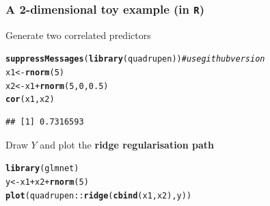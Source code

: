 \documentclass[10pt, c, xcolor=x11names]{beamer}\usepackage[]{graphicx}\usepackage[]{color}
\makeatletter
\newcommand{\hlnum}[1]{\textcolor[rgb]{0.686,0.059,0.569}{#1}}%
\newcommand{\hlcom}[1]{\textcolor[rgb]{0.678,0.584,0.686}{\textit{#1}}}%
\newcommand{\hlopt}[1]{\textcolor[rgb]{0,0,0}{#1}}%
\newcommand{\hlstd}[1]{\textcolor[rgb]{0.345,0.345,0.345}{#1}}%
\newcommand{\hlkwb}[1]{\textcolor[rgb]{0.69,0.353,0.396}{#1}}%
\newcommand{\hlkwd}[1]{\textcolor[rgb]{0.737,0.353,0.396}{\textbf{#1}}}%
\newenvironment{kframe}{%
 \def\at@end@of@kframe{}%
 \ifinner\ifhmode%
  \def\at@end@of@kframe{\end{minipage}}%
  \begin{minipage}{\columnwidth}%
 \fi\fi%
 \def\FrameCommand##1{\hskip\@totalleftmargin \hskip-\fboxsep
 \colorbox{shadecolor}{##1}\hskip-\fboxsep
     \hskip-\linewidth \hskip-\@totalleftmargin \hskip\columnwidth}%
 \MakeFramed {\advance\hsize-\width
   \@totalleftmargin\z@ \linewidth\hsize
   \@setminipage}}%
 {\par\unskip\endMakeFramed%
 \at@end@of@kframe}
\newenvironment{knitrout}{}{} %
\makeatother
\begin{document}
\begin{frame}
  \frametitle{A 2-dimensional toy example (in \texttt{R})}

Generate two correlated predictors
\begin{knitrout}\scriptsize
{}\color{fgcolor}\begin{kframe}
\begin{alltt}
\hlkwd{suppressMessages}\hlstd{(}\hlkwd{library}\hlstd{(quadrupen))} \hlcom{# use github version}
\hlstd{x1} \hlkwb{<-} \hlkwd{rnorm}\hlstd{(}\hlnum{5}\hlstd{)}
\hlstd{x2} \hlkwb{<-} \hlstd{x1} \hlopt{+} \hlkwd{rnorm}\hlstd{(}\hlnum{5}\hlstd{,}\hlnum{0}\hlstd{,} \hlnum{0.5}\hlstd{)}
\hlkwd{cor}\hlstd{(x1,x2)}
\end{alltt}
\begin{verbatim}
## [1] 0.7316593
\end{verbatim}
\end{kframe}
\end{knitrout}

Draw $Y$ and plot the  \alert{\bf ridge regularisation path}
\begin{knitrout}\scriptsize
{}\color{fgcolor}\begin{kframe}
\begin{alltt}
\hlkwd{library}\hlstd{(glmnet)}
\hlstd{y} \hlkwb{<-} \hlstd{x1} \hlopt{+} \hlstd{x2} \hlopt{+}\hlkwd{rnorm}\hlstd{(}\hlnum{5}\hlstd{)}
\hlkwd{plot}\hlstd{(quadrupen}\hlopt{::}\hlkwd{ridge}\hlstd{(}\hlkwd{cbind}\hlstd{(x1,x2),y))}
\end{alltt}


{\ttfamily\noindent\bfseries\color{errorcolor}{\#\# Error: 'ridge' is not an exported object from 'namespace:quadrupen'}}\end{kframe}
\end{knitrout}

\end{frame}
\end{document}
